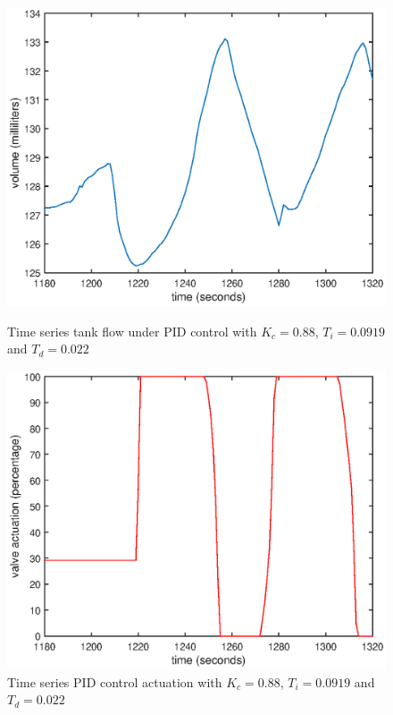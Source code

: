 \documentclass{article}
\begin{document}
\begin{figure}[h]
	\centering
	\begin{minipage}{0.45\textwidth}
		\centering
		\includegraphics[scale=0.4]{s_curve_2_level}
		\caption{Time series tank flow under PID control with $K_c = 0.88$, $T_i = 0.0919$ and $T_d = 0.022$}
	\end{minipage}
	\hspace{0.5cm}
	\begin{minipage}{0.45\textwidth}
		\centering
		\includegraphics[scale=0.4]{s_curve_2_control}
		\caption{Time series PID control actuation with $K_c = 0.88$, $T_i = 0.0919$ and $T_d = 0.022$}
	\end{minipage}
\end{figure}
\end{document}
